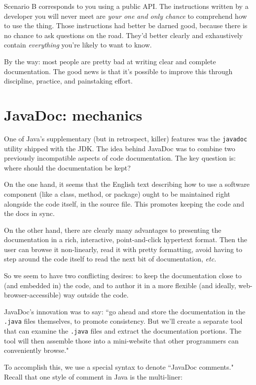 Scenario B corresponds to you using a public API. The instructions written by
a developer you will never meet are \textit{your one and only chance} to
comprehend how to use the thing. Those instructions had better be darned good,
because there is no chance to ask questions on the road. They'd better clearly
and exhaustively contain \textit{everything} you're likely to want to know.

By the way: most people are pretty bad at writing clear and complete
documentation. The good news is that it's possible to improve this through
discipline, practice, and painstaking effort.

\section{JavaDoc: mechanics}

One of Java's supplementary (but in retrospect, killer) features was the
\texttt{javadoc} utility shipped with the JDK. The idea behind JavaDoc was to
combine two previously incompatible aspects of code documentation. The key
question is: where should the documentation be kept?

On the one hand, it seems that the English text describing how to use a
software component (like a class, method, or package) ought to be maintained
right alongside the code itself, in the source file. This promotes keeping the
code and the docs in sync.

On the other hand, there are clearly many advantages to presenting the
documentation in a rich, interactive, point-and-click hypertext format. Then
the user can browse it non-linearly, read it with pretty formatting, avoid
having to step around the code itself to read the next bit of documentation,
\textit{etc.} 

So we seem to have two conflicting desires: to keep the documentation close to
(and embedded in) the code, and to author it in a more flexible (and ideally,
web-browser-accessible) way outside the code.

JavaDoc's innovation was to say: ``go ahead and store the documentation in the
\texttt{.java} files themselves, to promote consistency. But we'll create a
separate tool that can examine the \texttt{.java} files and extract the
documentation portions. The tool will then assemble those into a mini-website
that other programmers can conveniently browse."

To accomplish this, we use a special syntax to denote ``JavaDoc comments."
Recall that one style of comment in Java is the multi-liner:

